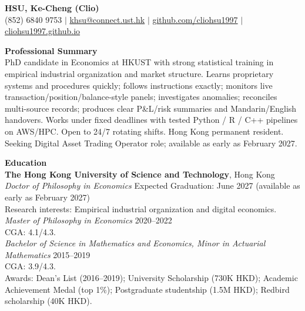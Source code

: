 \documentclass[11pt,letterpaper]{article}
\begin{document}
{\Large \textbf{HSU, Ke-Cheng (Clio)}}\\[1pt]
(852) 6840 9753 \quad $|$ \quad \href{mailto:khsu@connect.ust.hk}{khsu@connect.ust.hk} \quad $|$ \quad \href{https://github.com/cliohsu1997}{github.com/cliohsu1997} \quad $|$ \quad \href{https://cliohsu1997.github.io/}{cliohsu1997.github.io}

\vspace{0.15pt}

{\large \textbf{Professional Summary}}\\[-0.5pt]
PhD candidate in Economics at HKUST with strong statistical training in empirical industrial organization and market structure. Learns proprietary systems and procedures quickly; follows instructions exactly; monitors live transaction/position/balance-style panels; investigates anomalies; reconciles multi-source records; produces clear P\&L/risk summaries and Mandarin/English handovers. Works under fixed deadlines with tested Python / R / C++ pipelines on AWS/HPC. Open to 24/7 rotating shifts. Hong Kong permanent resident. Seeking Digital Asset Trading Operator role; available as early as February 2027.

\vspace{0.15pt}

{\large \textbf{Education}}\\[-0.5pt]
\textbf{The Hong Kong University of Science and Technology}, Hong Kong\\
\textit{Doctor of Philosophy in Economics} \hfill Expected Graduation: June 2027 (available as early as February 2027)\\
Research interests: Empirical industrial organization and digital economics.\\
\textit{Master of Philosophy in Economics} \hfill 2020--2022\\
CGA: 4.1/4.3.\\
\textit{Bachelor of Science in Mathematics and Economics, Minor in Actuarial Mathematics} \hfill 2015--2019\\
CGA: 3.9/4.3.\\
Awards: Dean's List (2016--2019); University Scholarship (730K HKD); Academic Achievement Medal (top 1\%); Postgraduate studentship (1.5M HKD); Redbird scholarship (40K HKD).

\vspace{0.15pt}
\end{document}
